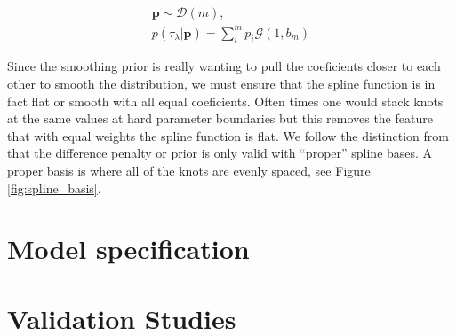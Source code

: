 \begin{align}
    \bm{p} \sim \mathcal{D}(m), \\
    p(\tau_\lambda | \bm{p}) = \sum_i^m p_i \mathcal{G}(1, b_m)
\end{align}




Since the smoothing prior is really wanting to pull the coeficients closer to each other to smooth the distribution, 
we must ensure that the spline function is in fact flat or smooth with all equal coeficients. Often times one would stack knots at the same values 
at hard parameter boundaries but this removes the feature that with equal weights the spline function is flat. We follow the distinction from  
that the difference penalty or prior is only valid with ``proper'' spline bases. A proper basis is where all of the knots are evenly spaced, see Figure \ref{fig:spline_basis}.

\section{Model specification} \label{sec:modelpriors}

\section{Validation Studies} \label{sec:validation}
